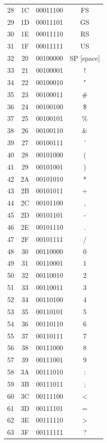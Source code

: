 \begin{figure}[h!]
{\begin{multicols}{2}
\begin{tabular}{|c|c|c|c|}
			28      &1C   &00011100      &FS   \\
			29      &1D   &00011101      &GS   \\
			30      &1E   &00011110      &RS   \\
			31      &1F   &00011111      &US   \\
			32      &20   &00100000      &SP [space]\\
			33      &21   &00100001      &!\\
			34      &22   &00100010      &"\\
			35      &23   &00100011      &\#\\
			36      &24   &00100100      & \$ \\
			37      &25   &00100101      &  \%  \\
			38      &26   &00100110      &  \&  \\
			39      &27   &00100111     &' \\
			40      &28   &00101000     &   ( \\
			41      &29   &00101001      &  ) \\
			42      &2A   &00101010       & * \\
			43      &2B   &00101011        &+ \\
			44      &2C   &00101100        &, \\
			45      &2D   &00101101        &- \\
			46      &2E   &00101110        &. \\
			47      &2F   &00101111        &/ \\
			48      &30   &00110000        &0\\
			49      &31   &00110001        &1\\
			50      &32   &00110010        &2\\
			51      &33   &00110011        &3\\
			52      &34   &00110100        &4\\
			53      &35   &00110101        &5\\
			54      &36   &00110110        &6\\
			55      &37   &00110111        &7\\
			56      &38   &00111000        &8\\
			57      &39   &00111001        &9\\
			58      &3A   &00111010        &:\\
			59      &3B   &00111011        &;\\
			60      &3C   &00111100        &<\\
			61      &3D   &00111101        &=\\
			62      &3E   &00111110        &>\\
			63      &3F   &00111111        &?\\
			\hline
		\end{tabular}


\end{multicols}}
\end{figure}
